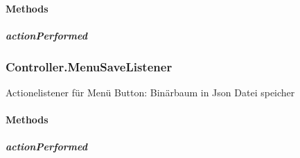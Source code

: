 \documentclass[letterpaper,10pt,ngerman]{sphinxmanual}
\begin{document}
\paragraph{Methods}
\label{\detokenize{com/linuxluigi/edu/Controller-MenuNewListener:methods}}

\subparagraph{actionPerformed}
\label{\detokenize{com/linuxluigi/edu/Controller-MenuNewListener:actionperformed}}

\begin{fulllineitems}
\label{\detokenize{com/linuxluigi/edu/Controller-MenuNewListener:com.linuxluigi.edu.Controller.MenuNewListener.actionPerformed(ActionEvent)}}
\end{fulllineitems}



\subsubsection{Controller.MenuSaveListener}
\label{\detokenize{com/linuxluigi/edu/Controller-MenuSaveListener::doc}}\label{\detokenize{com/linuxluigi/edu/Controller-MenuSaveListener:controller-menusavelistener}}

\begin{fulllineitems}
\label{\detokenize{com/linuxluigi/edu/Controller-MenuSaveListener:com.linuxluigi.edu.Controller.MenuSaveListener}}
Actionelistener für Menü Button: Binärbaum in Json Datei speicher

\end{fulllineitems}



\paragraph{Methods}
\label{\detokenize{com/linuxluigi/edu/Controller-MenuSaveListener:methods}}

\subparagraph{actionPerformed}
\label{\detokenize{com/linuxluigi/edu/Controller-MenuSaveListener:actionperformed}}
\end{document}
